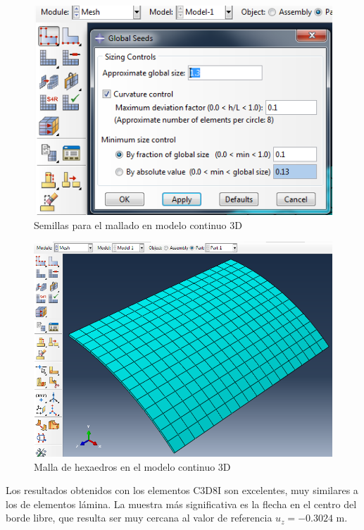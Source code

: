 \documentclass[spanish,a4paper,12pt]{article}
\begin{document}
\begin{figure}[htp]
\centering
\includegraphics[scale=0.5]{capturas/44-mesh-solid.png}
\caption{Semillas para el mallado en modelo continuo 3D}
\label{fig:mesh-s-solid}
\end{figure}
\begin{figure}[htb]
\centering
\includegraphics[scale=0.45]{capturas/45-mesh-solid.png}
\caption{Malla de hexaedros en el modelo continuo 3D}
\label{fig:mesh-m-solid}
\end{figure}

Los resultados obtenidos con los elementos C3D8I son excelentes, muy similares a los de elementos lámina. La muestra más significativa es la flecha en el centro del borde libre, que resulta ser muy cercana al valor de referencia $u_{z}=-0.3024$ m.
\end{document}
